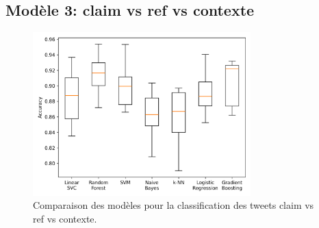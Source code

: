 \subsection{Modèle 3: claim vs ref vs contexte}\label{subsec:modele-3:-claim-vs-ref-vs-contexte}
\begin{figure}[H]
    \centering
    \includegraphics[width=0.75\textwidth]{images/model_comparison_3}
    \caption{Comparaison des modèles pour la classification des tweets claim vs ref vs contexte.}
    \label{fig:model_comparison_clm_ref_context}
\end{figure}

